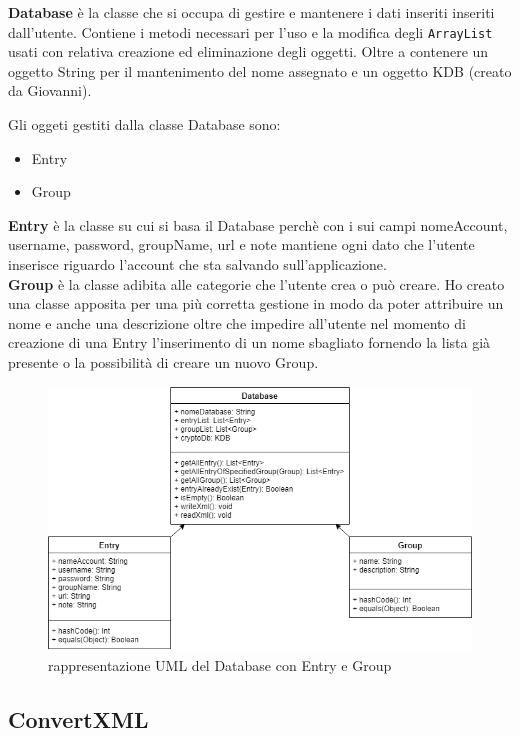 \documentclass[a4paper,12pt]{report}
\begin{document}
\textbf{Database} è la classe che si occupa di gestire e mantenere i dati inseriti inseriti dall'utente.
Contiene i metodi necessari per l'uso e la modifica degli \texttt{ArrayList} usati con relativa creazione
ed eliminazione degli oggetti.
Oltre a contenere un oggetto String per il mantenimento del nome assegnato e un oggetto KDB (creato da
Giovanni).

Gli oggeti gestiti dalla classe Database sono:
\begin{itemize}
  \item Entry
  \item Group
\end{itemize}

\textbf{Entry} è la classe su cui si basa il Database perchè con i sui campi nomeAccount, username,
password, groupName, url e note mantiene ogni dato che l'utente inserisce riguardo l'account che sta
salvando sull'applicazione.\\

\textbf{Group} è la classe adibita alle categorie che l'utente crea o può creare. Ho creato una classe
apposita per una più corretta gestione in modo da poter attribuire un nome e anche una descrizione oltre
che impedire all'utente nel momento di creazione di una Entry l'inserimento di un nome sbagliato fornendo
la lista già presente o la possibilità di creare un nuovo Group.


\begin{figure}[h]
\centering{}
\includegraphics[width=\textwidth]{DatabaseUml}
\caption{rappresentazione UML del Database con Entry e Group}
\end{figure}
\clearpage

\subsection*{ConvertXML}
\end{document}
